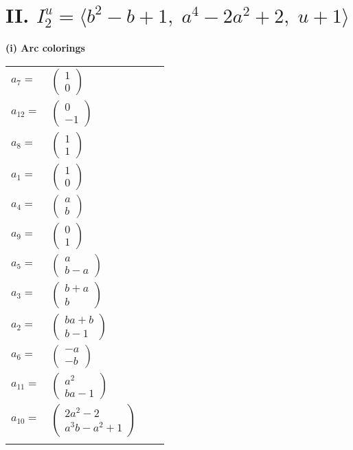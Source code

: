 \documentclass[1p]{elsarticle_modified}
\theoremstyle{definition}
\begin{document}
\centering \section*{II. $I^u_{2}= \langle b^2- b+1,\;a^4-2 a^2+2,\;u+1 \rangle$}
\flushleft \textbf{(i) Arc colorings}\\
\begin{tabular}{m{7pt} m{180pt} m{7pt} m{180pt} }
\flushright $a_{7}=$&$\begin{pmatrix}1\\0\end{pmatrix}$ \\
\flushright $a_{12}=$&$\begin{pmatrix}0\\-1\end{pmatrix}$ \\
\flushright $a_{8}=$&$\begin{pmatrix}1\\1\end{pmatrix}$ \\
\flushright $a_{1}=$&$\begin{pmatrix}1\\0\end{pmatrix}$ \\
\flushright $a_{4}=$&$\begin{pmatrix}a\\b\end{pmatrix}$ \\
\flushright $a_{9}=$&$\begin{pmatrix}0\\1\end{pmatrix}$ \\
\flushright $a_{5}=$&$\begin{pmatrix}a\\b- a\end{pmatrix}$ \\
\flushright $a_{3}=$&$\begin{pmatrix}b+a\\b\end{pmatrix}$ \\
\flushright $a_{2}=$&$\begin{pmatrix}b a+b\\b-1\end{pmatrix}$ \\
\flushright $a_{6}=$&$\begin{pmatrix}- a\\- b\end{pmatrix}$ \\
\flushright $a_{11}=$&$\begin{pmatrix}a^2\\b a-1\end{pmatrix}$ \\
\flushright $a_{10}=$&$\begin{pmatrix}2 a^2-2\\a^3 b- a^2+1\end{pmatrix}$\\&\end{tabular}
\end{document}
